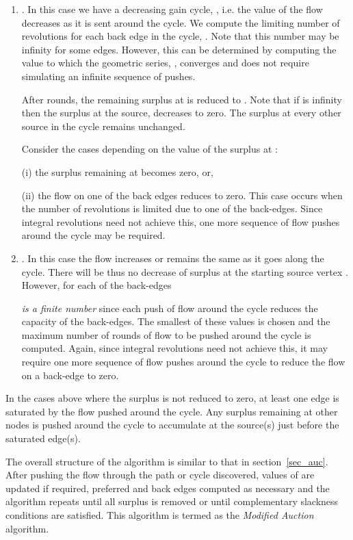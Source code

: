 \documentclass[11pt]{article}
\newcounter{rem}
\begin{document}
\begin{enumerate}
\begin{enumerate}
\item
. In this case we have a decreasing gain cycle, ,
i.e. the value of the flow
decreases as it is sent around the cycle. We compute the limiting number of 
revolutions for each back edge in the cycle, . 
Note that this number may be infinity for some edges. 
However, this can be determined  
by computing the value to which the geometric series, , converges 
and does not require simulating an infinite sequence of pushes. 






After  rounds, the remaining
surplus at  is reduced to . 
Note that if  is infinity then the surplus at the source,  decreases to zero.
The surplus at every other
source in the cycle remains unchanged.

Consider the cases depending on the value of the surplus at :

(i) the surplus remaining at  becomes zero, or,


(ii) the flow on one of the back edges reduces to zero.
This case occurs when the number of revolutions is limited due to one 
of the back-edges.
Since  integral revolutions need not achieve this, one more sequence
of flow pushes 
around the cycle may be required. 

\item
. In this case the flow increases or remains the same as it 
goes along the
cycle. There  will be thus no decrease of surplus at the starting source vertex . 
However, for each of the back-edges 

{\em is a finite number} since each push of flow around the cycle reduces the capacity of
the back-edges. 
The smallest of these  values is chosen and the maximum 
number of rounds of  flow 
to be pushed around the cycle is computed.
Again, since  integral revolutions need not achieve this, 
it may  require one more sequence of flow pushes  around the cycle 
to reduce the flow on a back-edge to zero.


\end{enumerate}

In the cases above where the surplus is not reduced to zero,
at least one edge is saturated by the flow pushed around the cycle.
Any surplus remaining at other nodes is pushed around the cycle to accumulate
at the source(s) just before the saturated edge(s).


\end{enumerate}

The overall structure of the algorithm is similar to that in 
section~\ref{sec_auc}.
After pushing the flow through the path or cycle discovered, values of 
are updated if required, preferred and back edges computed as necessary and
the algorithm repeats until all surplus is removed or
until complementary slackness conditions are satisfied.
This algorithm is termed as the  {\em Modified Auction} algorithm.
\end{document}
